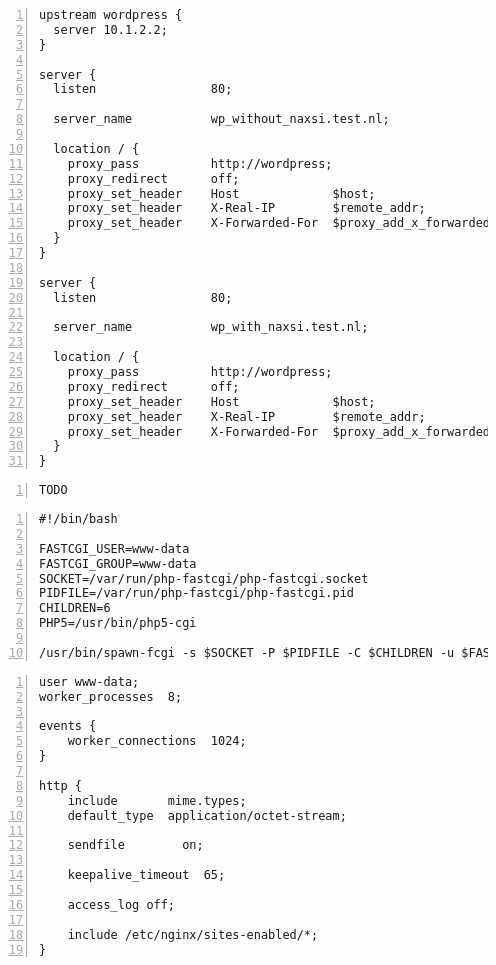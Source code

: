 \documentclass[Configuration]{subfiles}
\begin{document}
\begin{lstlisting}[frame=single,caption=/etc/nginx/sites-enabled/with\_wordpress,backgroundcolor=\color{gray},breaklines=true,numbers=left,]
upstream wordpress {
  server 10.1.2.2;
}

server {
  listen                80;

  server_name           wp_without_naxsi.test.nl;

  location / {
    proxy_pass          http://wordpress;
    proxy_redirect      off;
    proxy_set_header    Host             $host;
    proxy_set_header    X-Real-IP        $remote_addr;
    proxy_set_header    X-Forwarded-For  $proxy_add_x_forwarded_for;
  }
}

server {
  listen                80;

  server_name           wp_with_naxsi.test.nl;

  location / {
    proxy_pass          http://wordpress;
    proxy_redirect      off;
    proxy_set_header    Host             $host;
    proxy_set_header    X-Real-IP        $remote_addr;
    proxy_set_header    X-Forwarded-For  $proxy_add_x_forwarded_for;
  }
}
\end{lstlisting}

\begin{lstlisting}[frame=single,caption=/etc/nginx/sites-enabled/with\_wordpress,backgroundcolor=\color{gray},breaklines=true,numbers=left,]
TODO
\end{lstlisting}

\begin{lstlisting}[frame=single,caption=/usr/bin/php-fastcgi (needs chmod +x /usr/bin/php-fastcgi),backgroundcolor=\color{gray},breaklines=true,numbers=left,]
#!/bin/bash

FASTCGI_USER=www-data
FASTCGI_GROUP=www-data
SOCKET=/var/run/php-fastcgi/php-fastcgi.socket
PIDFILE=/var/run/php-fastcgi/php-fastcgi.pid
CHILDREN=6
PHP5=/usr/bin/php5-cgi

/usr/bin/spawn-fcgi -s $SOCKET -P $PIDFILE -C $CHILDREN -u $FASTCGI_USER -g $FASTCGI_GROUP -f $PHP5
\end{lstlisting}

\begin{lstlisting}[frame=single,caption=/etc/nginx/nginx.conf,backgroundcolor=\color{gray},breaklines=true,numbers=left,]
user www-data;
worker_processes  8;

events {
    worker_connections  1024;
}

http {
    include       mime.types;
    default_type  application/octet-stream;

    sendfile        on;

    keepalive_timeout  65;

    access_log off;

    include /etc/nginx/sites-enabled/*;
}
\end{lstlisting}
\end{document}
